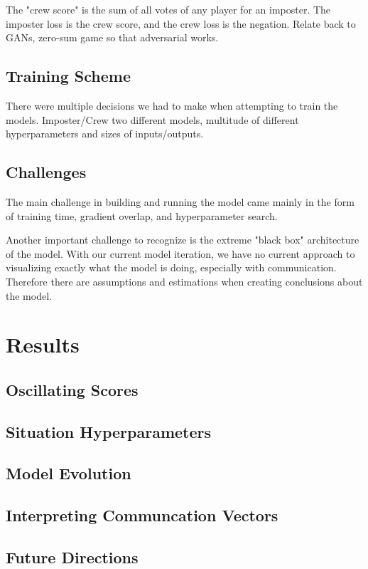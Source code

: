 \documentclass[10pt,twocolumn,letterpaper]{article}
\begin{document}
The "crew score" is the sum of all votes of any player for an imposter. The imposter loss
is the crew score, and the crew loss is the negation.
Relate back to GANs, zero-sum game so that adversarial works.
\subsection{Training Scheme}
There were multiple decisions we had to make when attempting to train the models.
Imposter/Crew two different models, multitude of different hyperparameters and
sizes of inputs/outputs.
\subsection{Challenges}
The main challenge in building and running the model
came mainly in the form of training time, gradient overlap, 
and hyperparameter search.

Another important challenge to recognize is the extreme "black box" architecture
of the model. With our current model iteration, we have no current approach to visualizing
exactly what the model is doing, especially with communication. Therefore there are
assumptions and estimations when creating conclusions about the model.

\section{Results}
\subsection{Oscillating Scores}
\subsection{Situation Hyperparameters}
\subsection{Model Evolution}
\subsection{Interpreting Communcation Vectors}
\subsection{Future Directions}


{\small


}
\end{document}
